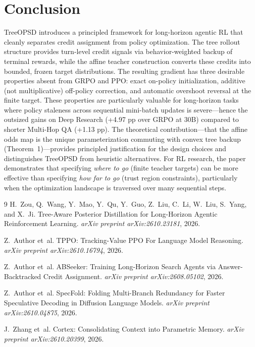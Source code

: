 \documentclass[11pt,a4paper]{article}
\begin{document}
\section{Conclusion}
TreeOPSD introduces a principled framework for long-horizon agentic RL that cleanly separates credit assignment from policy optimization. The tree rollout structure provides turn-level credit signals via behavior-weighted backup of terminal rewards, while the affine teacher construction converts these credits into bounded, frozen target distributions. The resulting gradient has three desirable properties absent from GRPO and PPO: exact on-policy initialization, additive (not multiplicative) off-policy correction, and automatic overshoot reversal at the finite target. These properties are particularly valuable for long-horizon tasks where policy staleness across sequential mini-batch updates is severe---hence the outsized gains on Deep Research (+4.97 pp over GRPO at 30B) compared to shorter Multi-Hop QA (+1.13 pp). The theoretical contribution---that the affine odds map is the unique parameterization commuting with convex tree backup (Theorem~1)---provides principled justification for the design choices and distinguishes TreeOPSD from heuristic alternatives. For RL research, the paper demonstrates that specifying \emph{where to go} (finite teacher targets) can be more effective than specifying \emph{how far to go} (trust region constraints), particularly when the optimization landscape is traversed over many sequential steps.

\begin{thebibliography}{9}
H.~Zou, Q.~Wang, Y.~Mao, Y.~Qu, Y.~Guo, Z.~Liu, C.~Li, W.~Liu, S.~Yang, and X.~Ji.
\newblock Tree-Aware Posterior Distillation for Long-Horizon Agentic Reinforcement Learning.
\newblock \emph{arXiv preprint arXiv:2610.23181}, 2026.

Z.~Author et~al.
\newblock TPPO: Tracking-Value PPO For Language Model Reasoning.
\newblock \emph{arXiv preprint arXiv:2610.16794}, 2026.

Z.~Author et~al.
\newblock ABSeeker: Training Long-Horizon Search Agents via Answer-Backtracked Credit Assignment.
\newblock \emph{arXiv preprint arXiv:2608.05102}, 2026.

Z.~Author et~al.
\newblock SpecFold: Folding Multi-Branch Redundancy for Faster Speculative Decoding in Diffusion Language Models.
\newblock \emph{arXiv preprint arXiv:2610.04875}, 2026.

J.~Zhang et~al.
\newblock Cortex: Consolidating Context into Parametric Memory.
\newblock \emph{arXiv preprint arXiv:2610.20399}, 2026.
\end{thebibliography}
\end{document}
